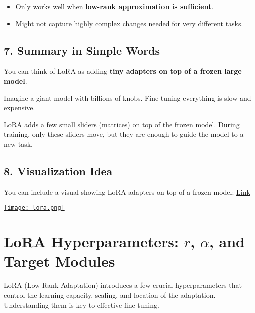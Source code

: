 \documentclass[a4paper, 12pt]{article}
\begin{document}
\begin{tcolorbox}[colback=red!5!white,colframe=red!75!black,title=Cons]
\begin{itemize}
    \item Only works well when \textbf{low-rank approximation is sufficient}.
    \item Might not capture highly complex changes needed for very different tasks.
\end{itemize}
\end{tcolorbox}

\subsection*{7. Summary in Simple Words}
\begin{tcolorbox}[colback=blue!5!white,colframe=blue!75!black,title=LoRA Simplified]
You can think of LoRA as adding \textbf{tiny adapters on top of a frozen large model}.  

Imagine a giant model with billions of knobs. Fine-tuning everything is slow and expensive.  

LoRA adds a few small sliders (matrices) on top of the frozen model.  
During training, only these sliders move, but they are enough to guide the model to a new task.
\end{tcolorbox}
\newpage
\subsection*{8. Visualization Idea}
You can include a visual showing LoRA adapters on top of a frozen model:
\href{https://blog.dailydoseofds.com/p/full-model-fine-tuning-vs-lora-vs}{Link}



\href{https://substackcdn.com/image/fetch/$s_!igxz!,f_auto,q_auto:good,fl_progressive:steep/https%3A%2F%2Fsubstack-post-media.s3.amazonaws.com%2Fpublic%2Fimages%2F1b402882-3dc1-4d5b-ba11-7f4f6d40d888_914x1116.gif}{%
    \texttt{[image: lora.png]}%
}
\newpage
\section*{LoRA Hyperparameters: $r$, $\alpha$, and Target Modules}

LoRA (Low-Rank Adaptation) introduces a few crucial hyperparameters that control the learning capacity, scaling, and location of the adaptation. Understanding them is key to effective fine-tuning.
\end{document}
